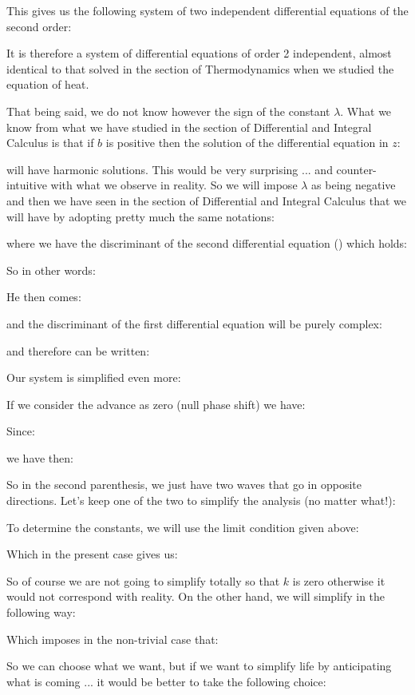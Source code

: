 	This gives us the following system of two independent differential equations of the second order:
	
	It is therefore a system of differential equations of order 2 independent, almost identical to that solved in the section of Thermodynamics when we studied the equation of heat.

	That being said, we do not know however the sign of the constant $\lambda$. What we know from what we have studied in the section of Differential and Integral Calculus is that if $b$ is positive then the solution of the differential equation in $z$:
	
	will have harmonic solutions. This would be very surprising ... and counter-intuitive with what we observe in reality. So we will impose $\lambda$ as being negative and then we have seen in the section of Differential and Integral Calculus that we will have by adopting pretty much the same notations:
	
	where we have the discriminant of the second differential equation () which holds:
	
	So in other words:
	
	He then comes:
	
	and the discriminant of the first differential equation will be purely complex:
	
	and therefore can be written:
	
	Our system is simplified even more:
	
	If we consider the advance as zero (null phase shift) we have:
	
	Since:	
	
	we have then:
	
	So in the second parenthesis, we just have two waves that go in opposite directions. Let's keep one of the two to simplify the analysis (no matter what!):
	
	To determine the constants, we will use the limit condition given above:
	
	Which in the present case gives us:
	
	So of course we are not going to simplify totally so that $k$ is zero otherwise it would not correspond with reality. On the other hand, we will simplify in the following way:
	
	Which imposes in the non-trivial case that:
	
	So we can choose what we want, but if we want to simplify life by anticipating what is coming ... it would be better to take the following choice:
	
